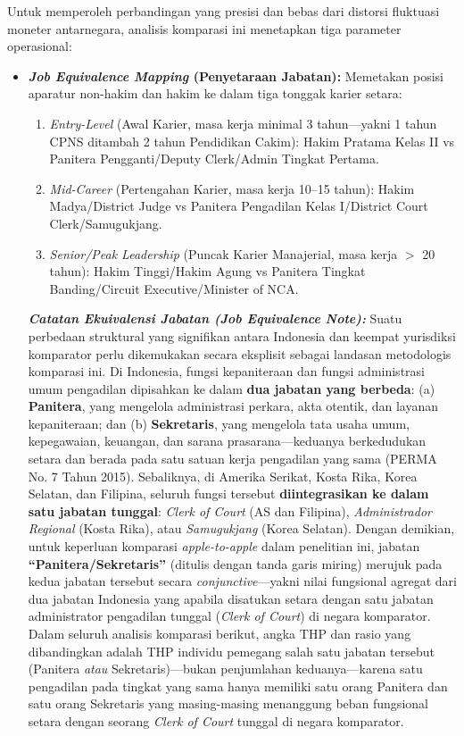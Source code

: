 \documentclass[12pt, a4paper]{article}
\begin{document}
Untuk memperoleh perbandingan yang presisi dan bebas dari distorsi fluktuasi moneter antarnegara, analisis komparasi ini menetapkan tiga parameter operasional:
\begin{itemize}
    \item \textbf{\textit{Job Equivalence Mapping} (Penyetaraan Jabatan):} Memetakan posisi aparatur non-hakim dan hakim ke dalam tiga tonggak karier setara:
    \begin{enumerate}
        \item \textit{Entry-Level} (Awal Karier, masa kerja minimal 3 tahun---yakni 1 tahun CPNS ditambah 2 tahun Pendidikan Cakim): Hakim Pratama Kelas II vs Panitera Pengganti/Deputy Clerk/Admin Tingkat Pertama.
        \item \textit{Mid-Career} (Pertengahan Karier, masa kerja 10--15 tahun): Hakim Madya/District Judge vs Panitera Pengadilan Kelas I/District Court Clerk/Samugukjang.
        \item \textit{Senior/Peak Leadership} (Puncak Karier Manajerial, masa kerja $>$ 20 tahun): Hakim Tinggi/Hakim Agung vs Panitera Tingkat Banding/Circuit Executive/Minister of NCA.
    \end{enumerate}
    \textit{\textbf{Catatan Ekuivalensi Jabatan (\textit{Job Equivalence Note}):}} Suatu perbedaan struktural yang signifikan antara Indonesia dan keempat yurisdiksi komparator perlu dikemukakan secara eksplisit sebagai landasan metodologis komparasi ini. Di Indonesia, fungsi kepaniteraan dan fungsi administrasi umum pengadilan dipisahkan ke dalam \textbf{dua jabatan yang berbeda}: (a) \textbf{Panitera}, yang mengelola administrasi perkara, akta otentik, dan layanan kepaniteraan; dan (b) \textbf{Sekretaris}, yang mengelola tata usaha umum, kepegawaian, keuangan, dan sarana prasarana---keduanya berkedudukan setara dan berada pada satu satuan kerja pengadilan yang sama (PERMA No. 7 Tahun 2015). Sebaliknya, di Amerika Serikat, Kosta Rika, Korea Selatan, dan Filipina, seluruh fungsi tersebut \textbf{diintegrasikan ke dalam satu jabatan tunggal}: \textit{Clerk of Court} (AS dan Filipina), \textit{Administrador Regional} (Kosta Rika), atau \textit{Samugukjang} (Korea Selatan). Dengan demikian, untuk keperluan komparasi \textit{apple-to-apple} dalam penelitian ini, jabatan \textbf{``Panitera/Sekretaris''} (ditulis dengan tanda garis miring) merujuk pada kedua jabatan tersebut secara \textit{conjunctive}---yakni nilai fungsional agregat dari dua jabatan Indonesia yang apabila disatukan setara dengan satu jabatan administrator pengadilan tunggal (\textit{Clerk of Court}) di negara komparator. Dalam seluruh analisis komparasi berikut, angka THP dan rasio yang dibandingkan adalah THP individu pemegang salah satu jabatan tersebut (Panitera \textit{atau} Sekretaris)---bukan penjumlahan keduanya---karena satu pengadilan pada tingkat yang sama hanya memiliki satu orang Panitera dan satu orang Sekretaris yang masing-masing menanggung beban fungsional setara dengan seorang \textit{Clerk of Court} tunggal di negara komparator.

\end{itemize}
\end{document}
